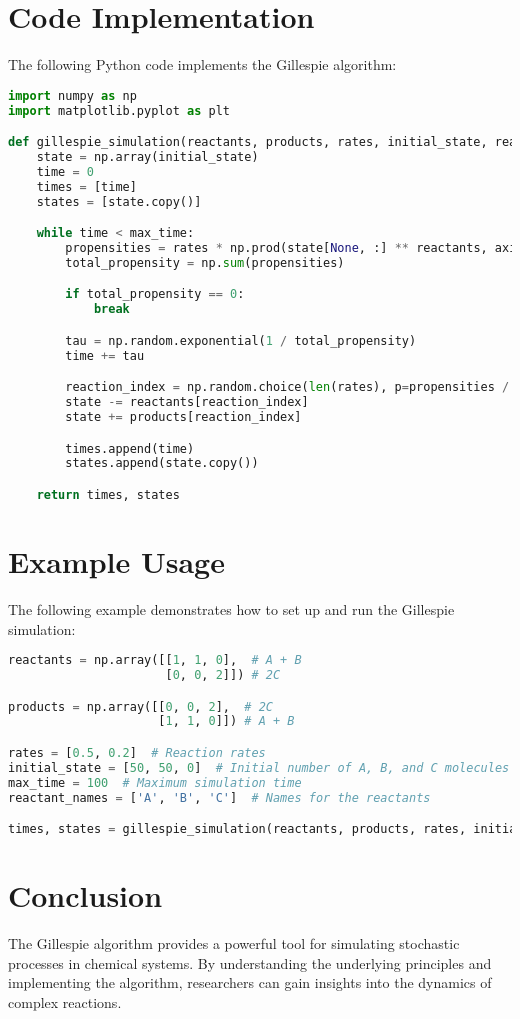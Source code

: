 \documentclass{article}
\begin{document}
\section{Code Implementation}
The following Python code implements the Gillespie algorithm:

\begin{lstlisting}[language=Python, caption=Gillespie Simulation Code, basicstyle=\ttfamily\small, keywordstyle=\color{blue}]
import numpy as np
import matplotlib.pyplot as plt

def gillespie_simulation(reactants, products, rates, initial_state, reactant_names, max_time):
    state = np.array(initial_state)
    time = 0
    times = [time]
    states = [state.copy()]

    while time < max_time:
        propensities = rates * np.prod(state[None, :] ** reactants, axis=1)
        total_propensity = np.sum(propensities)

        if total_propensity == 0:
            break

        tau = np.random.exponential(1 / total_propensity)
        time += tau

        reaction_index = np.random.choice(len(rates), p=propensities / total_propensity)
        state -= reactants[reaction_index]
        state += products[reaction_index]

        times.append(time)
        states.append(state.copy())

    return times, states
\end{lstlisting}

\section{Example Usage}
The following example demonstrates how to set up and run the Gillespie simulation:

\begin{lstlisting}[language=Python, caption=Example Usage, basicstyle=\ttfamily\small]
reactants = np.array([[1, 1, 0],  # A + B
                      [0, 0, 2]]) # 2C

products = np.array([[0, 0, 2],  # 2C
                     [1, 1, 0]]) # A + B

rates = [0.5, 0.2]  # Reaction rates
initial_state = [50, 50, 0]  # Initial number of A, B, and C molecules
max_time = 100  # Maximum simulation time
reactant_names = ['A', 'B', 'C']  # Names for the reactants

times, states = gillespie_simulation(reactants, products, rates, initial_state, reactant_names, max_time)
\end{lstlisting}

\section{Conclusion}
The Gillespie algorithm provides a powerful tool for simulating stochastic processes in chemical systems. By understanding the underlying principles and implementing the algorithm, researchers can gain insights into the dynamics of complex reactions.
\end{document}
